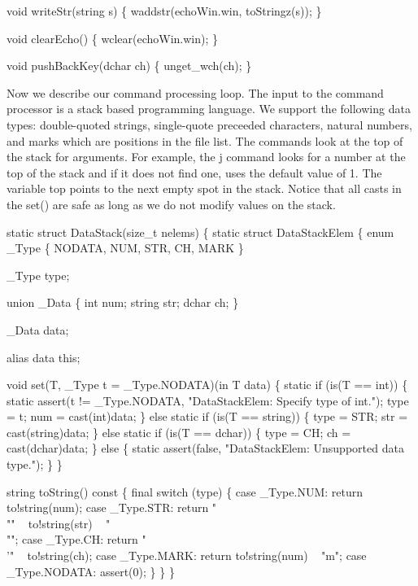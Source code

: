 void writeStr(string s)
\{
  waddstr(echoWin.win, toStringz(s));
\}

void clearEcho()
\{
  wclear(echoWin.win);
\}

void pushBackKey(dchar ch)
\{
  unget_wch(ch);
\}

\nwendcode{}Now we describe our command processing loop. The input to the
command processor is a stack based programming language. We support
the following data types: double-quoted strings, single-quote
preceeded characters, natural numbers, and marks which are positions
in the file list. The commands look at the top of the stack for
arguments. For example, the {\Tt{}j\nwendquote} command looks for a number at the
top of the stack and if it does not find one, uses the default value
of 1. The variable {\Tt{}top\nwendquote} points to the next empty spot in the
stack. Notice that all casts in the {\Tt{}set()\nwendquote} are safe as long as we
do not modify values on the stack.

\nwenddocs{}\endmoddef\nwstartdeflinemarkup\nwenddeflinemarkup
static struct DataStack(size_t nelems) \{
  static struct DataStackElem \{
    enum _Type \{ NODATA, NUM, STR, CH, MARK \}

    _Type type;
  
    union _Data \{
      int num;
      string str;
      dchar ch;
    \}

    _Data data;
  
    alias data this;
    
    void set(T, _Type t = _Type.NODATA)(in T data) \{
      static if (is(T == int)) \{
        static assert(t != _Type.NODATA,
          "DataStackElem: Specify type of int.");
        type = t;
        num  = cast(int)data;
      \} else static if (is(T == string)) \{
        type = STR;
        str = cast(string)data;
      \} else static if (is(T == dchar)) \{
        type = CH;
        ch = cast(dchar)data;
      \} else \{
        static assert(false,
          "DataStackElem: Unsupported data type.");
      \}
    \}

    string toString() const \{
      final switch (type) \{
      case _Type.NUM:    return to!string(num);
      case _Type.STR:    return "\\"" ~ to!string(str) ~ "\\"";
      case _Type.CH:     return "\\'" ~ to!string(ch);
      case _Type.MARK:   return to!string(num) ~ "m";
      case _Type.NODATA: assert(0);
      \}
    \}
  \}

